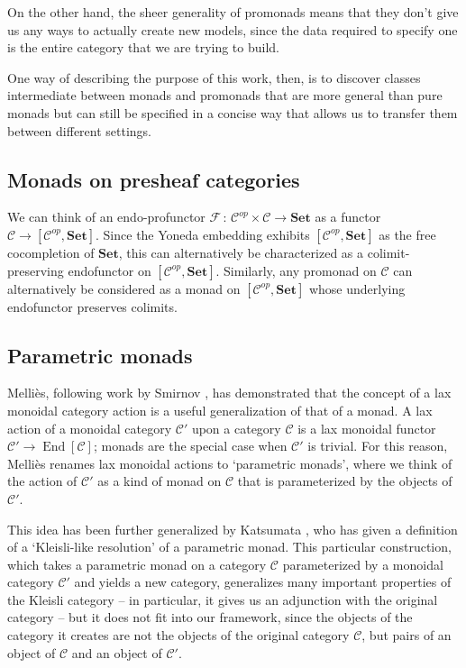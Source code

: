 \documentclass{svproc}
\newcommand\C{\mathcal{C}}
\newcommand\F{\mathcal{F}}
\newcommand\from{\,\colon\,}
\DeclareMathOperator{\End}{End}
\newcommand\Mellies{Melli\`{e}s\xspace}
\newcommand{\catname}[1]{\mathbf{#1}}
\newcommand{\Set}{\catname{Set}}
\begin{document}
On the other hand, the sheer generality of promonads means that they don't give us any ways to actually create new models, since the data required to specify one is the entire category that we are trying to build.

One way of describing the purpose of this work, then, is to discover classes intermediate between monads and promonads that are more general than pure monads but can still be specified in a concise way that allows us to transfer them between different settings.

\subsection{Monads on presheaf categories}

We can think of an endo-profunctor $\F\from \C^{op}\times\C\to \Set$ as a functor $\C\to [\C^{op},\Set]$.  
Since the Yoneda embedding exhibits $[\C^{op},\Set]$ as the free cocompletion of $\Set$, this can alternatively be characterized as a colimit-preserving endofunctor on $[\C^{op},\Set]$.  
Similarly, any promonad on $\C$ can alternatively be considered as a monad on $[\C^{op},\Set]$ whose underlying endofunctor preserves colimits.

\subsection{Parametric monads}

\Mellies \cite{ParametricMonads}, following work by Smirnov \cite{Smirnov2008}, has demonstrated that the concept of a lax monoidal category action is a useful generalization of that of a monad.  
A lax action of a monoidal category $\C'$ upon a category $\C$ is a lax monoidal functor $\C'\to \End[\C]$; monads are the special case when $\C'$ is trivial.  
For this reason, \Mellies renames lax monoidal actions to `parametric monads', where we think of the action of $\C'$ as a kind of monad on $\C$ that is parameterized by the objects of $\C'$.

This idea has been further generalized by Katsumata \cite{Katsu}, who has given a definition of a `Kleisli-like resolution' of a parametric monad.  
This particular construction, which takes a parametric monad on a category $\C$ parameterized by a monoidal category $\C'$ and yields a new category, generalizes many important properties of the Kleisli category -- in particular, it gives us an adjunction with the original category -- but it does not fit into our framework, since the objects of the category it creates are not the objects of the original category $\C$, but pairs of an object of $\C$ and an object of $\C'$.
\end{document}
